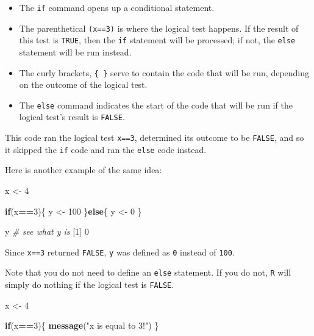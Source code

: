 \documentclass[]{book}
\newenvironment{Shaded}{\begin{snugshade}}{\end{snugshade}}
\newcommand{\CommentTok}[1]{\textcolor[rgb]{0.56,0.35,0.01}{\textit{#1}}}
\newcommand{\ControlFlowTok}[1]{\textcolor[rgb]{0.13,0.29,0.53}{\textbf{#1}}}
\newcommand{\DecValTok}[1]{\textcolor[rgb]{0.00,0.00,0.81}{#1}}
\newcommand{\KeywordTok}[1]{\textcolor[rgb]{0.13,0.29,0.53}{\textbf{#1}}}
\newcommand{\NormalTok}[1]{#1}
\newcommand{\OperatorTok}[1]{\textcolor[rgb]{0.81,0.36,0.00}{\textbf{#1}}}
\newcommand{\StringTok}[1]{\textcolor[rgb]{0.31,0.60,0.02}{#1}}
\providecommand{\tightlist}{%
  \setlength{\itemsep}{0pt}\setlength{\parskip}{0pt}}
\begin{document}
\begin{itemize}
\tightlist
\item
  The \texttt{if} command opens up a conditional statement.
\item
  The parenthetical \texttt{(x==3)} is where the logical test happens. If the result of this test is \texttt{TRUE}, then the \texttt{if} statement will be processed; if not, the \texttt{else} statement will be run instead.
\item
  The curly brackets, \texttt{\{\ \}} serve to contain the code that will be run, depending on the outcome of the logical test.
\item
  The \texttt{else} command indicates the start of the code that will be run if the logical test's result is \texttt{FALSE}.
\end{itemize}

This code ran the logical test \texttt{x==3}, determined its outcome to be \texttt{FALSE}, and so it skipped the \texttt{if} code and ran the \texttt{else} code instead.

Here is another example of the same idea:

\begin{Shaded}
\begin{Highlighting}[]
\NormalTok{x <-}\StringTok{ }\DecValTok{4}

\ControlFlowTok{if}\NormalTok{(x}\OperatorTok{==}\DecValTok{3}\NormalTok{)\{}
\NormalTok{  y <-}\StringTok{ }\DecValTok{100}
\NormalTok{\}}\ControlFlowTok{else}\NormalTok{\{}
\NormalTok{  y <-}\StringTok{ }\DecValTok{0}
\NormalTok{\}}

\NormalTok{y }\CommentTok{# see what y is}
\NormalTok{[}\DecValTok{1}\NormalTok{] }\DecValTok{0}
\end{Highlighting}
\end{Shaded}

Since \texttt{x==3} returned \texttt{FALSE}, \texttt{y} was defined as \texttt{0} instead of \texttt{100}.

Note that you do not need to define an \texttt{else} statement. If you do not, \texttt{R} will simply do nothing if the logical test is \texttt{FALSE}.

\begin{Shaded}
\begin{Highlighting}[]
\NormalTok{x <-}\StringTok{ }\DecValTok{4}

\ControlFlowTok{if}\NormalTok{(x}\OperatorTok{==}\DecValTok{3}\NormalTok{)\{}
  \KeywordTok{message}\NormalTok{(}\StringTok{"x is equal to 3!"}\NormalTok{)}
\NormalTok{\}}
\end{Highlighting}
\end{Shaded}
\end{document}
